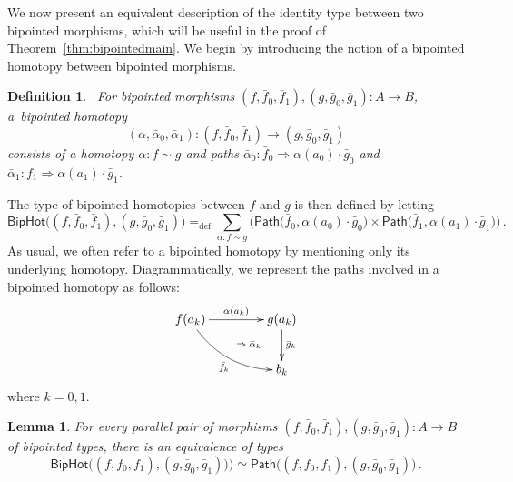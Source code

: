 \documentclass[10pt,a4paper,oneside,reqno]{amsart}
\numberwithin{equation}{section}
\theoremstyle{mythm}
\newtheorem{lemma}[theorem]{Lemma}
\theoremstyle{mydef}
\newtheorem{definition}[theorem]{Definition}
\theoremstyle{myrmk}
\newcommand{\defeq}{=_{\mathrm{def}}}
\newcommand{\co}{\colon}
\newcommand{\ct}{\cdot}
\newcommand{\Id}{\mathsf{Path}}
\newcommand{\BipHot}{\mathsf{BipHot}}
\begin{document}
We now present an equivalent description of the identity type between two bipointed morphisms, which 
will be useful in the proof of Theorem~\ref{thm:bipointedmain}. We begin by introducing the notion of a bipointed homotopy between bipointed morphisms.





\begin{definition}\ \label{thm:biphomotopy} For bipointed morphisms $(f, \bar{f}_0, \bar{f}_1) , (g, \bar{g}_0, \bar{g}_1) \co A \to B$, a~\emph{bipointed homotopy} 
\[
(\alpha, \bar{\alpha}_0, \bar{\alpha}_1) \co (f, \bar{f}_0, \bar{f}_1) \to  (g, \bar{g}_0, \bar{g}_1)
\] 
consists of a homotopy $\alpha \co  f \sim g$ and paths
$\bar{\alpha}_0 \co   \bar{f}_0 \Rightarrow \alpha(a_0)  \cdot \bar{g}_0$ and $\bar{\alpha}_1 \co 
\bar{f}_1 \Rightarrow \alpha(a_1) \cdot \bar{g}_1$. 
\end{definition}

The type of bipointed homotopies between $f$ and $g$ is then defined by letting
\[
 \BipHot  \big( (f,\bar{f}_0, \bar{f}_1), (g, \bar{g}_0, \bar{g}_1) \big)   \defeq   
 \sum_{\alpha \co f \sim g}  \big( 
  \Id\big( \bar{f}_0 ,  \alpha(a_0)  \ct \bar{g}_0 \big) \times 
  \Id \big( \bar{f}_1,  \alpha(a_1) \ct  \bar{g}_1 \big) \big) \, .
\]
As usual, we often refer to a bipointed homotopy by mentioning only its underlying homotopy.
Diagrammatically, we represent the paths  involved in a bipointed homotopy as follows:
\[
\xymatrix@C=1.5cm{
f(a_k) \ar[r]^{\alpha(a_k)}  \ar@/_1pc/[dr]_{\bar{f}_k}  
\ar@{}[dr]|{\qquad \Rightarrow \; \bar{\alpha}_k}  & g(a_k) \ar[d]^{\bar{g}_k}  \\ 
 & b_k }
  \] 
where $k = 0, 1$. 


\begin{lemma} \label{BoolHomSpace} 
For every parallel pair of morphisms $(f, \bar{f}_0, \bar{f}_1), (g, \bar{g}_0, \bar{g}_1) \co A \to B$ of bipointed types, there is an equivalence of types
\[
\BipHot\big( (f, \bar{f}_0, \bar{f}_1), (g, \bar{g}_0, \bar{g}_1) ) \big) \simeq 
\Id \big( (f, \bar{f}_0, \bar{f}_1), (g, \bar{g}_0, \bar{g}_1) \big)\, .
\]
\end{lemma}
\end{document}
